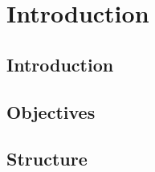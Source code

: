 \chapter{Introduction}
\label{introduction}

\section{Introduction}
\label{intro_introduction}

\section{Objectives}
\label{intro_objectives}

\section{Structure}
\label{intro_structure}